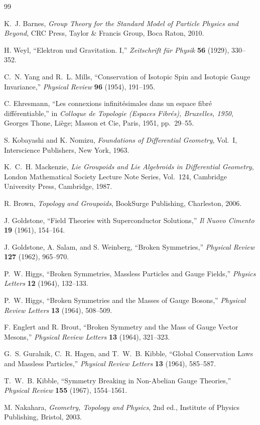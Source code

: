 \documentclass[11pt]{article}
\begin{document}
\begin{thebibliography}{99}

K.~J. Barnes,
\textit{Group Theory for the Standard Model of Particle Physics and Beyond},
CRC Press, Taylor \& Francis Group, Boca Raton, 2010.

H. Weyl,
``Elektron und Gravitation. I,''
\textit{Zeitschrift f\"ur Physik}
\textbf{56} (1929), 330--352.

C.~N. Yang and R.~L. Mills,
``Conservation of Isotopic Spin and Isotopic Gauge Invariance,''
\textit{Physical Review}
\textbf{96} (1954), 191--195.

C. Ehresmann,
``Les connexions infinit\'esimales dans un espace fibr\'e diff\'erentiable,''
in \textit{Colloque de Topologie (Espaces Fibr\'es), Bruxelles, 1950},
Georges Thone, Li\`ege; Masson et Cie, Paris, 1951, pp.~29--55.

S. Kobayashi and K. Nomizu,
\textit{Foundations of Differential Geometry},
Vol.~I,
Interscience Publishers, New York, 1963.

K.~C.~H. Mackenzie,
\textit{Lie Groupoids and Lie Algebroids in Differential Geometry},
London Mathematical Society Lecture Note Series, Vol.~124,
Cambridge University Press, Cambridge, 1987.

R. Brown,
\textit{Topology and Groupoids},
BookSurge Publishing, Charleston, 2006.

J. Goldstone,
``Field Theories with Superconductor Solutions,''
\textit{Il Nuovo Cimento}
\textbf{19} (1961), 154--164.

J. Goldstone, A. Salam, and S. Weinberg,
``Broken Symmetries,''
\textit{Physical Review}
\textbf{127} (1962), 965--970.

P.~W. Higgs,
``Broken Symmetries, Massless Particles and Gauge Fields,''
\textit{Physics Letters}
\textbf{12} (1964), 132--133.

P.~W. Higgs,
``Broken Symmetries and the Masses of Gauge Bosons,''
\textit{Physical Review Letters}
\textbf{13} (1964), 508--509.

F. Englert and R. Brout,
``Broken Symmetry and the Mass of Gauge Vector Mesons,''
\textit{Physical Review Letters}
\textbf{13} (1964), 321--323.

G.~S. Guralnik, C.~R. Hagen, and T.~W.~B. Kibble,
``Global Conservation Laws and Massless Particles,''
\textit{Physical Review Letters}
\textbf{13} (1964), 585--587.

T.~W.~B. Kibble,
``Symmetry Breaking in Non-Abelian Gauge Theories,''
\textit{Physical Review}
\textbf{155} (1967), 1554--1561.

M. Nakahara,
\textit{Geometry, Topology and Physics},
2nd ed.,
Institute of Physics Publishing, Bristol, 2003.

\end{thebibliography}
\end{document}
